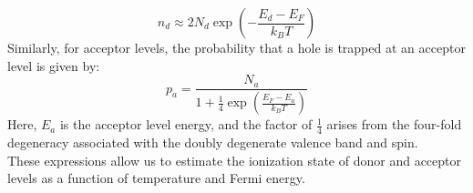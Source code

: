 \begin{equation}
	n_d \approx 2 N_d \exp\left( -\frac{E_d - E_F}{k_B T} \right)
\end{equation}
Similarly, for acceptor levels, the probability that a hole is trapped at an acceptor level is given by:
\begin{equation}
	p_a = \frac{N_a}{1 + \frac{1}{4} \exp\left( \frac{E_F - E_a}{k_B T} \right)}
\end{equation}
\noindent
Here, \( E_a \) is the acceptor level energy, and the factor of \( \frac{1}{4} \) arises from the four-fold degeneracy associated with the doubly degenerate valence band and spin.\\
These expressions allow us to estimate the ionization state of donor and acceptor levels as a function of temperature and Fermi energy.


